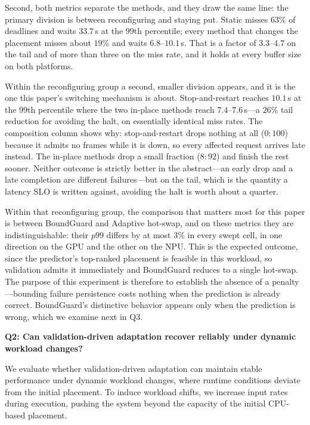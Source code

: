 \documentclass[conference]{IEEEtran}
\begin{document}
{{Second, both metrics separate the methods, and they draw the same line: the primary division is between reconfiguring and staying put. Static misses $63\%$ of deadlines and waits $33.7$\,s at the $99$th percentile; every method that changes the placement misses about $19\%$ and waits $6.8$--$10.1$\,s. That is a factor of $3.3$--$4.7$ on the tail and of more than three on the miss rate, and it holds at every buffer size on both platforms.

Within the reconfiguring group a second, smaller division appears, and it is the one this paper's switching mechanism is about. Stop-and-restart reaches $10.1$\,s at the $99$th percentile where the two in-place methods reach $7.4$--$7.6$\,s---a $26\%$ tail reduction for avoiding the halt, on essentially identical miss rates. The composition column shows why: stop-and-restart drops nothing at all ($0{:}100$) because it admits no frames while it is down, so every affected request arrives late instead. The in-place methods drop a small fraction ($8{:}92$) and finish the rest sooner. Neither outcome is strictly better in the abstract---an early drop and a late completion are different failures---but on the tail, which is the quantity a latency SLO is written against, avoiding the halt is worth about a quarter.

Within that reconfiguring group, the comparison that matters most for this paper is between BoundGuard and Adaptive hot-swap, and on these metrics they are indistinguishable: their $p99$ differs by at most $3\%$ in every swept cell, in one direction on the GPU and the other on the NPU. This is the expected outcome, since the predictor's top-ranked placement is feasible in this workload, so validation admits it immediately and BoundGuard reduces to a single hot-swap. The purpose of this experiment is therefore to establish the absence of a penalty---bounding failure persistence costs nothing when the prediction is already correct. BoundGuard's distinctive behavior appears only when the prediction is wrong, which we examine next in Q3.}

\vspace{0.5em}
\noindent\textbf{Q2: Can validation-driven adaptation recover reliably under dynamic workload changes?}

We evaluate whether validation-driven adaptation can maintain stable performance under dynamic workload changes, where runtime conditions deviate from the initial placement.
%
To induce workload shifts, we increase input rates during execution, pushing the system beyond the capacity of the initial CPU-based placement.

}
\end{document}
